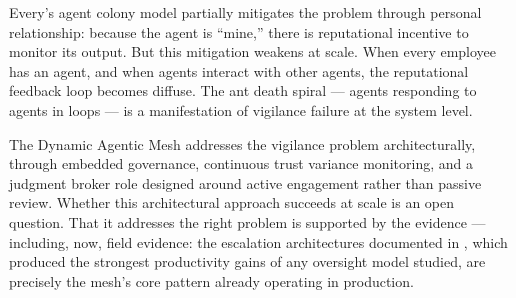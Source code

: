 Every's agent colony model partially mitigates the problem through personal relationship: because the agent is ``mine,'' there is reputational incentive to monitor its output. But this mitigation weakens at scale. When every employee has an agent, and when agents interact with other agents, the reputational feedback loop becomes diffuse. The ant death spiral --- agents responding to agents in loops --- is a manifestation of vigilance failure at the system level.

The Dynamic Agentic Mesh addresses the vigilance problem architecturally, through embedded governance, continuous trust variance monitoring, and a judgment broker role designed around active engagement rather than passive review. Whether this architectural approach succeeds at scale is an open question. That it addresses the right problem is supported by the evidence --- including, now, field evidence: the escalation architectures documented in \textcite{Pereira2026Playbook}, which produced the strongest productivity gains of any oversight model studied, are precisely the mesh's core pattern already operating in production.
